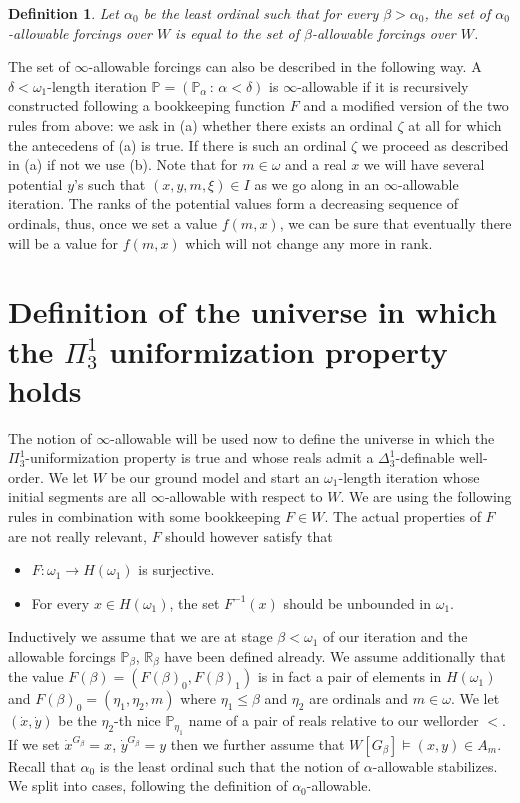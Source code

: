 \documentclass[a4paper,11pt]{article}
\newtheorem{definition}[theorem]{Definition}
\newcommand{\forceP}{\mathbb{P}}
\newcommand{\forceR}{\mathbb{R}}
\begin{document}
\begin{definition}
Let $\alpha_0$ be the least ordinal such that for every $\beta> \alpha_0$, the set of $\alpha_0$-allowable forcings over $W$ is equal to the set of $\beta$-allowable forcings over $W$. 
\end{definition}
The set of $\infty$-allowable forcings can also be described in the following way. A $\delta < \omega_1$-length iteration $\forceP= (\forceP_{\alpha} \, : \, \alpha< \delta)$ is $\infty$-allowable if it is recursively constructed following a bookkeeping function $F$ and a modified version of the two rules from above: we ask in (a) whether there exists an ordinal $\zeta$ at all for which the antecedens of (a) is true. If there is such an ordinal $\zeta$ we proceed as described in (a) if not we use (b). 
Note that for  $m\in \omega$ and a real $x$ we will have several potential $y$'s such that $(x,y,m,\xi) \in I$ as we go along in an $\infty$-allowable iteration. The ranks of the potential values form a decreasing sequence of ordinals, thus, once we set a value $f(m,x)$, we can be sure that eventually there will be a value for $f(m,x)$ which will not change any more in rank. 

\section{Definition of the universe in which the ${\Pi^1_3}$ uniformization property holds}
The notion of $\infty$-allowable will be used now to define the universe in which the ${\Pi^1_3}$-uniformization property is true and whose reals admit a $\Delta^1_3$-definable well-order. We let $W$ be our ground model and start an $\omega_1$-length iteration whose initial segments are all $\infty$-allowable with respect to $W$. We are using the following rules in combination with some bookkeeping $F \in W$. 
The actual properties of $F$ are not really relevant, $F$ should however satisfy that \begin{itemize}
\item $F: \omega_1 \rightarrow H(\omega_1)$ is surjective.
\item For every $x \in H(\omega_1)$, the set $F^{-1} (x)$ should be unbounded in $\omega_1$.
\end{itemize}


Inductively we assume that we are at stage $\beta < \omega_1$ of our iteration and the allowable forcings $\forceP_{\beta}$, $\forceR_{\beta}$ have been defined already. We assume additionally that the value $F(\beta)=(F(\beta)_0, F(\beta)_1)$ is in fact a pair of elements in $H(\omega_1)$ and $F(\beta)_0=(\eta_1, \eta_2, m)$ where $\eta_1 \le \beta$ and $\eta_2$ are ordinals and $m \in \omega$.
We let $(\dot{x}, \dot{y})$ be the $\eta_2$-th nice $\forceP_{\eta_1}$ name of a pair of reals relative to our wellorder $<$.
If we set  $\dot{x}^{G_{\beta}}=x$, $\dot{y}^{G_{\beta}}=y$ then we further assume that $W[G_{\beta}] \models (x,y) \in A_m$. Recall that $\alpha_0$ is the least ordinal such that the notion of $\alpha$-allowable stabilizes. We split into cases, following the definition of $\alpha_0$-allowable.
\end{document}

